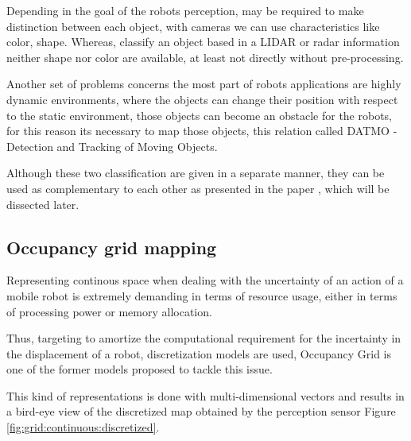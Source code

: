 Depending in the goal of the robots perception, may be required to make distinction between each object, with cameras we can use characteristics like color, shape. Whereas, classify an object based in a LIDAR or radar information neither shape nor color are available, at least not directly without pre-processing.

Another set of problems concerns the most part of robots applications are highly dynamic environments, where the objects can change their position with respect to the static environment, those objects can become an obstacle for the robots, for this reason its necessary to map those objects, this relation called DATMO - Detection and Tracking of Moving Objects.

Although these two classification are given in a separate manner, they can be used as complementary to each other as presented in the paper \cite{Wang04a}, which will be dissected later.

\subsection{Occupancy grid mapping}

Representing continous space when dealing with the uncertainty of an action of a mobile robot is extremely demanding in terms of resource usage, either in terms of processing power or memory allocation.

Thus, targeting to amortize the computational requirement for the incertainty in the displacement of a robot, discretization models are used, Occupancy Grid\cite{Elfes:1989:UOG:68491.68495} is one of the former models proposed to tackle this issue.

This kind of representations is done with multi-dimensional vectors and results in a bird-eye view of the discretized map obtained by the perception sensor Figure \ref{fig:grid:continuous:discretized}.


